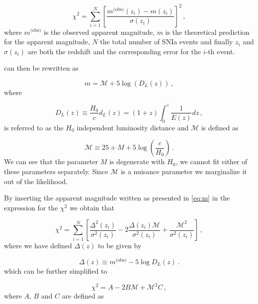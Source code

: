 \begin{equation}
    \chi^2 = \sum_{i=1}^N \left[ \frac{m^\text{(obs)}(z_i) - m(z_i)}{\sigma(z_i)} \right]^2 \,,
\end{equation}
where $m^\text{(obs)}$ is the observed apparent magnitude, $m$ is the theoretical prediction for the apparent magnitude, $N$ the total number of \gls{SNIa} events and finally $z_i$ and $\sigma(z_i)$ are both the redshift and the corresponding error for the $i$-th event.

 can then be rewritten as

\begin{equation}
    \label{eq:m}
    m = \mathcal{M} + 5 \log{( D_L(z) )} \,,
\end{equation}
where

\begin{equation}
    D_L(z) \equiv \frac{H_0}{c} d_L(z) = (1+z) \int_0^z \frac{1}{E(z)} dz \,,
\end{equation}
is referred to as the $H_0$ independent luminosity distance and $\mathcal{M}$ is defined as

\begin{equation}
    \mathcal{M} \equiv 25 + M + 5 \log{\left( \frac{c}{H_0} \right)} \,.
\end{equation}
We can see that the parameter $M$ is degenerate with $H_0$, we cannot fit either of these parameters separately. Since $\mathcal{M}$ is a nuisance parameter we marginalize it out of the likelihood.

By inserting the apparent magnitude written as presented in \cref{eq:m} in the expression for the $\chi^2$ we obtain that

\begin{equation}
    \chi^2 = \sum_{i=1}^N \left[
    \frac{\Delta^2(z_i)}{\sigma^2(z_i)} -
    2\frac{\Delta(z_i) \mathcal{M}}{\sigma^2(z_i)} +
    \frac{\mathcal{M}^2}{\sigma^2(z_i)}
    \right] \,,
\end{equation}
where we have defined $\Delta(z)$ to be given by

\begin{equation}
    \Delta(z) \equiv m^\text{(obs)} - 5 \log{D_L(z)} \,.
\end{equation}
which can be further simplified to

\begin{equation}
    \label{eq:chi2-no-marginalization}
    \chi^2 = A - 2B\mathcal{M} + \mathcal{M}^2 C \,,
\end{equation}
where $A$, $B$ and $C$ are defined as

